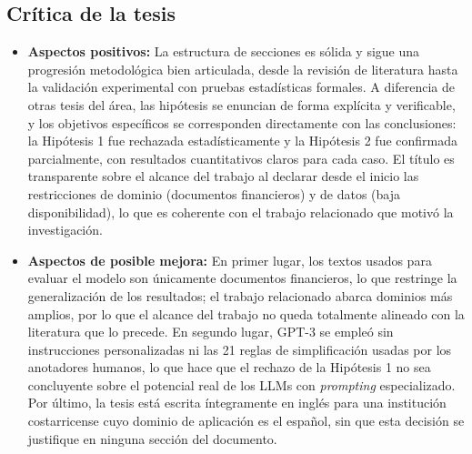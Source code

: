 \subsection{Crítica de la tesis}
\begin{itemize}
    \item \textbf{Aspectos positivos:} La estructura de secciones es sólida y sigue una progresión metodológica bien articulada, desde la revisión de literatura hasta la validación experimental con pruebas estadísticas formales. A diferencia de otras tesis del área, las hipótesis se enuncian de forma explícita y verificable, y los objetivos específicos se corresponden directamente con las conclusiones: la Hipótesis 1 fue rechazada estadísticamente y la Hipótesis 2 fue confirmada parcialmente, con resultados cuantitativos claros para cada caso. El título es transparente sobre el alcance del trabajo al declarar desde el inicio las restricciones de dominio (documentos financieros) y de datos (baja disponibilidad), lo que es coherente con el trabajo relacionado que motivó la investigación.
    \item \textbf{Aspectos de posible mejora:} En primer lugar, los textos usados para evaluar el modelo son únicamente documentos financieros, lo que restringe la generalización de los resultados; el trabajo relacionado abarca dominios más amplios, por lo que el alcance del trabajo no queda totalmente alineado con la literatura que lo precede. En segundo lugar, GPT-3 se empleó sin instrucciones personalizadas ni las 21 reglas de simplificación usadas por los anotadores humanos, lo que hace que el rechazo de la Hipótesis 1 no sea concluyente sobre el potencial real de los LLMs con \textit{prompting} especializado. Por último, la tesis está escrita íntegramente en inglés para una institución costarricense cuyo dominio de aplicación es el español, sin que esta decisión se justifique en ninguna sección del documento.
\end{itemize}
